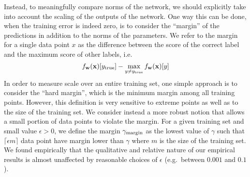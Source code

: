 \documentclass{article}
\begin{document}
Instead, to meaningfully compare norms of the network, we should
explicitly take into account the scaling of the outputs of the
network. One way this can be done, when the training error is indeed
zero, is to consider the ``margin'' of the predictions in addition to
the norms of the parameters.  We refer to the margin for a single data
point $x$ as the difference between the score of the correct label and
the maximum score of other labels, i.e.
\begin{equation}
  \label{eq:margin}
 f_{\mathbf{w}}(\mathbf{x})[y_\text{true}] -
\max_{y\neq y_\text{true}} f_{\mathbf{w}}(\mathbf{x})[y] 
\end{equation}
In order to measure scale over an entire training set, one simple
approach is to consider the ``hard margin'', which is the minimum
margin among all training points.  However, this definition is very
sensitive to extreme points as well as to the size of the training
set.  We consider instead a more robust notion that allows a small
portion of data points to violate the margin. For a given training set
and small value $\epsilon>0$, we define the margin $\gamma_{\text{margin}}$ as
the lowest value of $\gamma$ such that $\lceil \epsilon m \rceil$ data
point have margin lower than $\gamma$ where $m$ is the size of the
training set.  We found empirically that the qualitative and relative
nature of our empirical results is almost unaffected by reasonable
choices of $\epsilon$ (e.g.~between $0.001$ and $0.1$).

\end{document}
